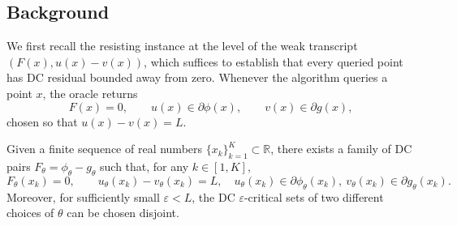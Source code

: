 \subsection{Background}
\label{subsec:background-pair}

We first recall the resisting instance at the level of the
weak transcript $(F(x),u(x)-v(x))$, which suffices to establish that
every queried point has DC residual bounded away from zero. Whenever the algorithm queries a point \(x\), the oracle returns
\[
    F(x)=0,\qquad
    u(x)\in\partial\phi(x),\qquad
    v(x)\in\partial g(x),
\]
chosen so that $u(x)-v(x)=L$. 


\begin{lemma}
\label{lem:background-pair}
Given a finite sequence of real numbers
\(\{x_k\}_{k=1}^K\subset\mathbb R\), there exists a family of DC pairs
\(F_\theta=\phi_\theta-g_\theta\) such that, for any \(k\in[1,K]\),
\[
    F_\theta(x_k)=0,\qquad
    u_\theta(x_k)-v_\theta(x_k)=L,
    \quad
    u_\theta(x_k)\in\partial\phi_\theta(x_k),\
    v_\theta(x_k)\in\partial g_\theta(x_k).
\]
Moreover, for sufficiently small \(\varepsilon<L\), the DC
\(\varepsilon\)-critical sets of two different choices of \(\theta\) can be
chosen disjoint.
\end{lemma} 

